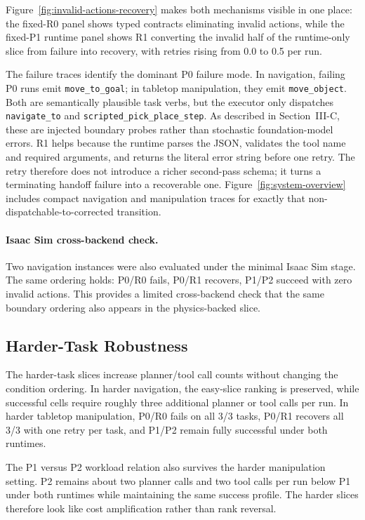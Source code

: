 

Figure~\ref{fig:invalid-actions-recovery} makes both mechanisms visible in one
place: the fixed-R0 panel shows typed contracts eliminating invalid actions,
while the fixed-P1 runtime panel shows R1 converting the invalid half of the
runtime-only slice from failure into recovery, with retries rising from 0.0 to
0.5 per run.

The failure traces identify the dominant P0 failure mode. In navigation,
failing P0 runs emit \texttt{move\_to\_goal}; in tabletop manipulation, they
emit \texttt{move\_object}. Both are semantically plausible task verbs, but
the executor only dispatches \texttt{navigate\_to} and
\texttt{scripted\_pick\_place\_step}. As described in Section~III-C, these
are injected boundary probes rather than stochastic foundation-model errors.
R1 helps because the runtime parses the JSON, validates the tool name and
required arguments, and returns the literal error string before one retry.
The retry therefore does not introduce a richer second-pass schema; it turns
a terminating handoff failure into a recoverable one.
Figure~\ref{fig:system-overview} includes compact navigation and manipulation
traces for exactly that
non-dispatchable-to-corrected transition.

\paragraph{Isaac Sim cross-backend check.}
Two navigation instances were also evaluated under the minimal Isaac Sim
stage. The same ordering holds: P0/R0 fails, P0/R1 recovers, P1/P2 succeed
with zero invalid actions. This provides a limited cross-backend check that the same boundary
ordering also appears in the physics-backed slice.

\subsection{Harder-Task Robustness}

The harder-task slices increase planner/tool call counts without changing the
condition ordering. In harder navigation, the easy-slice ranking is preserved,
while successful cells require roughly three additional planner or tool calls
per run. In harder tabletop manipulation, P0/R0 fails on all 3/3 tasks,
P0/R1 recovers all 3/3 with one retry per task, and P1/P2 remain fully
successful under both runtimes.

The P1 versus P2 workload relation also survives the harder manipulation
setting. P2 remains about two planner calls and two tool calls per run below
P1 under both runtimes while maintaining the same success profile. The harder
slices therefore look like cost amplification rather than rank reversal.
